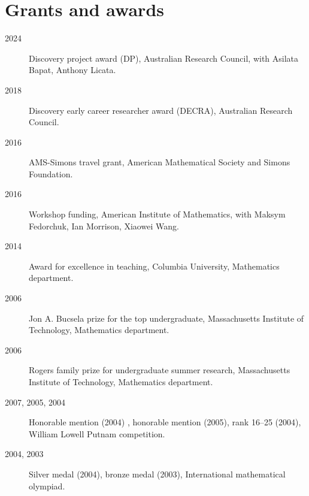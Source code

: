 \documentclass[11pt]{article}
\begin{document}
\section*{Grants and awards}
\label{sec:orgc37255a}
\label{orgd109b0d}
\begin{description}
\item[{2024}] Discovery project award (DP), Australian Research Council, with Asilata Bapat, Anthony Licata.
\item[{2018}] Discovery early career researcher award (DECRA), Australian Research Council.
\item[{2016}] AMS-Simons travel grant, American Mathematical Society and Simons Foundation.
\item[{2016}] Workshop funding, American Institute of Mathematics, with Maksym Fedorchuk, Ian Morrison, Xiaowei Wang.
\item[{2014}] Award for excellence in teaching, Columbia University, Mathematics department.
\item[{2006}] Jon A. Bucsela prize for the top undergraduate, Massachusetts Institute of Technology, Mathematics department.
\item[{2006}] Rogers family prize for undergraduate summer research, Massachusetts Institute of Technology, Mathematics department.
\item[{2007, 2005, 2004}] Honorable mention (2004) , honorable mention (2005), rank 16--25 (2004), William Lowell Putnam competition.
\item[{2004, 2003}] Silver medal (2004), bronze medal (2003), International mathematical olympiad.
\end{description}
\end{document}
